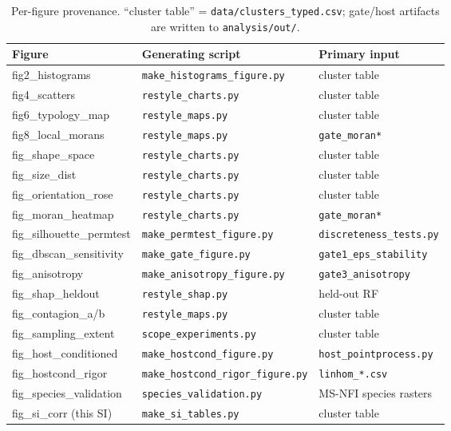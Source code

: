 \documentclass{article}
\begin{document}
\begin{table}[h]
\centering
\small
\begin{tabular}{@{}lll@{}}
\toprule
\textbf{Figure} & \textbf{Generating script} & \textbf{Primary input} \\
\midrule
fig2\_histograms & \texttt{make\_histograms\_figure.py} & cluster table \\
fig4\_scatters & \texttt{restyle\_charts.py} & cluster table \\
fig6\_typology\_map & \texttt{restyle\_maps.py} & cluster table \\
fig8\_local\_morans & \texttt{restyle\_maps.py} & \texttt{gate\_moran*} \\
fig\_shape\_space & \texttt{restyle\_charts.py} & cluster table \\
fig\_size\_dist & \texttt{restyle\_charts.py} & cluster table \\
fig\_orientation\_rose & \texttt{restyle\_charts.py} & cluster table \\
fig\_moran\_heatmap & \texttt{restyle\_charts.py} & \texttt{gate\_moran*} \\
fig\_silhouette\_permtest & \texttt{make\_permtest\_figure.py} & \texttt{discreteness\_tests.py} \\
fig\_dbscan\_sensitivity & \texttt{make\_gate\_figure.py} & \texttt{gate1\_eps\_stability} \\
fig\_anisotropy & \texttt{make\_anisotropy\_figure.py} & \texttt{gate3\_anisotropy} \\
fig\_shap\_heldout & \texttt{restyle\_shap.py} & held-out RF \\
fig\_contagion\_a/b & \texttt{restyle\_maps.py} & cluster table \\
fig\_sampling\_extent & \texttt{scope\_experiments.py} & cluster table \\
fig\_host\_conditioned & \texttt{make\_hostcond\_figure.py} & \texttt{host\_pointprocess.py} \\
fig\_hostcond\_rigor & \texttt{make\_hostcond\_rigor\_figure.py} & \texttt{linhom\_*.csv} \\
fig\_species\_validation & \texttt{species\_validation.py} & MS-NFI species rasters \\
fig\_si\_corr (this SI) & \texttt{make\_si\_tables.py} & cluster table \\
\bottomrule
\end{tabular}
\caption{Per-figure provenance. ``cluster table'' = \texttt{data/clusters\_typed.csv}; gate/host
artifacts are written to \texttt{analysis/out/}.}
\label{tab:si-prov}
\end{table}
\end{document}
